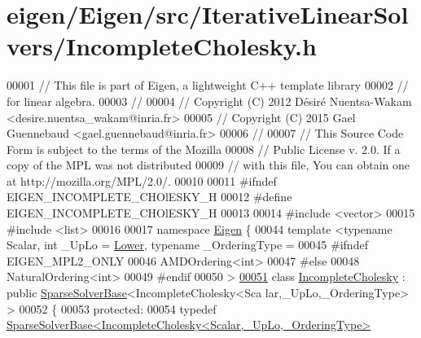\hypertarget{eigen_2_eigen_2src_2_iterative_linear_solvers_2_incomplete_cholesky_8h_source}{}\section{eigen/\+Eigen/src/\+Iterative\+Linear\+Solvers/\+Incomplete\+Cholesky.h}
\label{eigen_2_eigen_2src_2_iterative_linear_solvers_2_incomplete_cholesky_8h_source}

\begin{DoxyCode}
00001 \textcolor{comment}{// This file is part of Eigen, a lightweight C++ template library}
00002 \textcolor{comment}{// for linear algebra.}
00003 \textcolor{comment}{//}
00004 \textcolor{comment}{// Copyright (C) 2012 Désiré Nuentsa-Wakam <desire.nuentsa\_wakam@inria.fr>}
00005 \textcolor{comment}{// Copyright (C) 2015 Gael Guennebaud <gael.guennebaud@inria.fr>}
00006 \textcolor{comment}{//}
00007 \textcolor{comment}{// This Source Code Form is subject to the terms of the Mozilla}
00008 \textcolor{comment}{// Public License v. 2.0. If a copy of the MPL was not distributed}
00009 \textcolor{comment}{// with this file, You can obtain one at http://mozilla.org/MPL/2.0/.}
00010 
00011 \textcolor{preprocessor}{#ifndef EIGEN\_INCOMPLETE\_CHOlESKY\_H}
00012 \textcolor{preprocessor}{#define EIGEN\_INCOMPLETE\_CHOlESKY\_H}
00013 
00014 \textcolor{preprocessor}{#include <vector>}
00015 \textcolor{preprocessor}{#include <list>}
00016 
00017 \textcolor{keyword}{namespace }\hyperlink{namespace_eigen}{Eigen} \{  
00044 \textcolor{keyword}{template} <\textcolor{keyword}{typename} Scalar, \textcolor{keywordtype}{int} \_UpLo = \hyperlink{group__enums_gga39e3366ff5554d731e7dc8bb642f83cda891792b8ed394f7607ab16dd716f60e6}{Lower}, \textcolor{keyword}{typename} \_OrderingType =
00045 \textcolor{preprocessor}{#ifndef EIGEN\_MPL2\_ONLY}
00046 AMDOrdering<int>
00047 \textcolor{preprocessor}{#else}
00048 NaturalOrdering<int>
00049 \textcolor{preprocessor}{#endif}
00050 >
\hyperlink{class_eigen_1_1_incomplete_cholesky}{00051} \textcolor{keyword}{class }\hyperlink{class_eigen_1_1_incomplete_cholesky}{IncompleteCholesky} : \textcolor{keyword}{public} \hyperlink{group___sparse_core___module_class_eigen_1_1_sparse_solver_base}{SparseSolverBase}<IncompleteCholesky<Sca
      lar,\_UpLo,\_OrderingType> >
00052 \{
00053   \textcolor{keyword}{protected}:
00054     \textcolor{keyword}{typedef} \hyperlink{group___sparse_core___module_class_eigen_1_1_sparse_solver_base}{SparseSolverBase<IncompleteCholesky<Scalar,\_UpLo,\_OrderingType>}

\end{DoxyCode}
